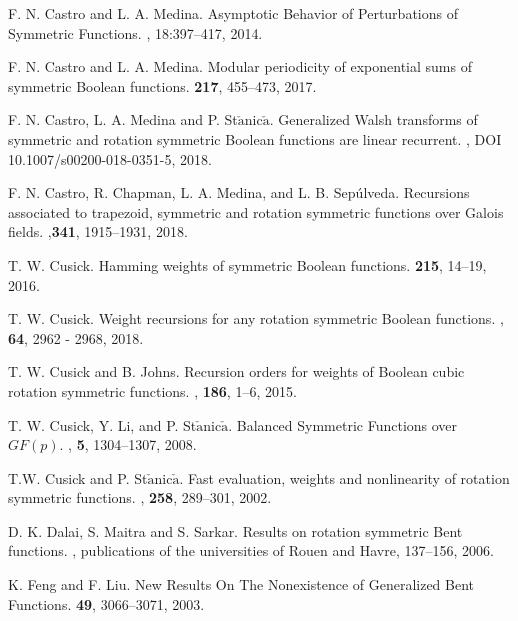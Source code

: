 \begin{thebibliography}{1}
 F. N. Castro and L. A. Medina. 
\newblock Asymptotic Behavior of Perturbations of Symmetric Functions.  
, 18:397--417, 2014.

 F. N. Castro and L. A. Medina. 
\newblock Modular periodicity of exponential sums of symmetric Boolean functions.
 {\bf 217}, 455--473, 2017.

 F. N. Castro, L. A. Medina and P. St$\check{\mbox{a}}$nic$\check{\mbox{a}}$.
\newblock Generalized Walsh transforms of symmetric and rotation symmetric Boolean functions are linear recurrent.
, DOI 10.1007/s00200-018-0351-5, 2018.

 F. N. Castro, R. Chapman, L. A. Medina, and L. B. Sep\'ulveda.  
\newblock Recursions associated to trapezoid, symmetric and rotation symmetric functions over Galois fields.
,{\bf 341}, 1915--1931, 2018.

 T. W. Cusick. 
\newblock Hamming weights of symmetric Boolean functions.
 {\bf 215}, 14--19, 2016.

 T. W. Cusick.
\newblock Weight recursions for any rotation symmetric Boolean functions.
, {\bf 64}, 2962 - 2968, 2018.

 T. W. Cusick and B. Johns.
\newblock Recursion orders for weights of Boolean cubic rotation symmetric functions.
, {\bf 186}, 1--6, 2015.

 T. W. Cusick, Y. Li, and  P. St$\check{\mbox{a}}$nic$\check{\mbox{a}}$.
\newblock Balanced Symmetric Functions over $GF(p)$.
, {\bf 5}, 1304--1307, 2008.

 T.W. Cusick and P. St$\check{\mbox{a}}$nic$\check{\mbox{a}}$.
\newblock Fast evaluation, weights and nonlinearity of rotation symmetric functions.
, {\bf 258}, 289--301, 2002.

 D. K. Dalai, S. Maitra and S. Sarkar. 
\newblock Results on rotation symmetric Bent functions.
, publications of the universities of Rouen and Havre, 137--156, 2006.

 K. Feng and F. Liu. 
\newblock New Results On The Nonexistence of Generalized Bent Functions. 
 {\bf 49},  3066--3071, 2003.


\end{thebibliography}
